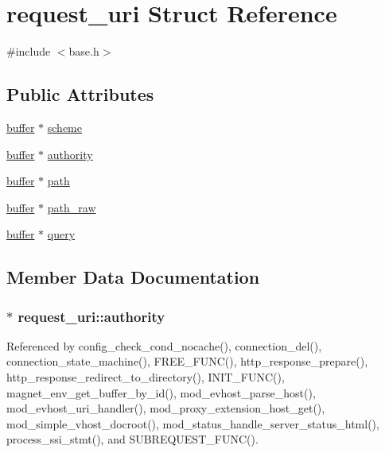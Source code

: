 \hypertarget{structrequest__uri}{\section{request\-\_\-uri Struct Reference}
\label{structrequest__uri}
}


{\ttfamily \#include $<$base.\-h$>$}

\subsection*{Public Attributes}
\begin{DoxyCompactItemize}
\item 
\hyperlink{structbuffer}{buffer} $\ast$ \hyperlink{structrequest__uri_ae38b75ebd9c40c255309b30b9b5f22f2}{scheme}
\item 
\hyperlink{structbuffer}{buffer} $\ast$ \hyperlink{structrequest__uri_a6eed7b3388637c71599649463ce1355c}{authority}
\item 
\hyperlink{structbuffer}{buffer} $\ast$ \hyperlink{structrequest__uri_a508eadf9e21989cd41cb45fe7c0475c4}{path}
\item 
\hyperlink{structbuffer}{buffer} $\ast$ \hyperlink{structrequest__uri_a2dfa985efd813074da98d2d75c4ae8e3}{path\-\_\-raw}
\item 
\hyperlink{structbuffer}{buffer} $\ast$ \hyperlink{structrequest__uri_ad45f79467c7ec2112cf16fee49db534a}{query}
\end{DoxyCompactItemize}


\subsection{Member Data Documentation}
\hypertarget{structrequest__uri_a6eed7b3388637c71599649463ce1355c}{
\subsubsection[{authority}]{$\ast$ request\-\_\-uri\-::authority}}\label{structrequest__uri_a6eed7b3388637c71599649463ce1355c}


Referenced by config\-\_\-check\-\_\-cond\-\_\-nocache(), connection\-\_\-del(), connection\-\_\-state\-\_\-machine(), F\-R\-E\-E\-\_\-\-F\-U\-N\-C(), http\-\_\-response\-\_\-prepare(), http\-\_\-response\-\_\-redirect\-\_\-to\-\_\-directory(), I\-N\-I\-T\-\_\-\-F\-U\-N\-C(), magnet\-\_\-env\-\_\-get\-\_\-buffer\-\_\-by\-\_\-id(), mod\-\_\-evhost\-\_\-parse\-\_\-host(), mod\-\_\-evhost\-\_\-uri\-\_\-handler(), mod\-\_\-proxy\-\_\-extension\-\_\-host\-\_\-get(), mod\-\_\-simple\-\_\-vhost\-\_\-docroot(), mod\-\_\-status\-\_\-handle\-\_\-server\-\_\-status\-\_\-html(), process\-\_\-ssi\-\_\-stmt(), and S\-U\-B\-R\-E\-Q\-U\-E\-S\-T\-\_\-\-F\-U\-N\-C().

